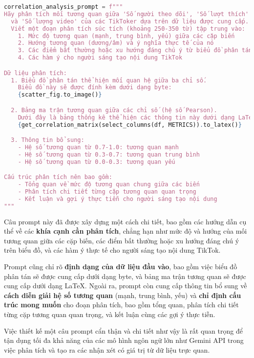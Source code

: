 \vietnameselst
\begin{lstlisting}[language=Python]
correlation_analysis_prompt = f"""
Hãy phân tích mối tương quan giữa 'Số người theo dõi', 'Số lượt thích'
  và 'Số lượng video' của các TikToker dựa trên dữ liệu được cung cấp.
  Viết một đoạn phân tích súc tích (khoảng 250-350 từ) tập trung vào:
    1. Mức độ tương quan (mạnh, trung bình, yếu) giữa các cặp biến
    2. Hướng tương quan (dương/âm) và ý nghĩa thực tế của nó
    3. Các điểm bất thường hoặc xu hướng đáng chú ý từ biểu đồ phân tán
    4. Các hàm ý cho người sáng tạo nội dung TikTok

Dữ liệu phân tích:
  1. Biểu đồ phân tán thể hiện mối quan hệ giữa ba chỉ số. 
    Biểu đồ này sẽ được đính kèm dưới dạng byte:
    {scatter_fig.to_image()}

  2. Bảng ma trận tương quan giữa các chỉ số (hệ số Pearson).
    Dưới đây là bảng thống kê thể hiện các thông tin này dưới dạng LaTeX:
    {get_correlation_matrix(select_columns(df, METRICS)).to_latex()}

  3. Thông tin bổ sung: 
    - Hệ số tương quan từ 0.7-1.0: tương quan mạnh
    - Hệ số tương quan từ 0.3-0.7: tương quan trung bình
    - Hệ số tương quan từ 0.0-0.3: tương quan yếu

Cấu trúc phân tích nên bao gồm:
    - Tổng quan về mức độ tương quan chung giữa các biến
    - Phân tích chi tiết từng cặp tương quan quan trọng 
    - Kết luận và gợi ý thực tiễn cho người sáng tạo nội dung
"""
\end{lstlisting}

Câu prompt này đã được xây dựng một cách chi tiết, bao gồm các hướng dẫn cụ thể về các \textbf{khía cạnh cần phân tích}, chẳng hạn như mức độ và hướng của mối tương quan giữa các cặp biến, các điểm bất thường hoặc xu hướng đáng chú ý trên biểu đồ, và các hàm ý thực tế cho người sáng tạo nội dung TikTok.

Prompt cũng chỉ rõ \textbf{định dạng của dữ liệu đầu vào}, bao gồm việc biểu đồ phân tán sẽ được cung cấp dưới dạng byte, và bảng ma trận tương quan sẽ được cung cấp dưới dạng LaTeX. Ngoài ra, prompt còn cung cấp thông tin bổ sung về \textbf{cách diễn giải hệ số tương quan} (mạnh, trung bình, yếu) và \textbf{chỉ định cấu trúc mong muốn} cho đoạn phân tích, bao gồm tổng quan, phân tích chi tiết từng cặp tương quan quan trọng, và kết luận cùng các gợi ý thực tiễn.

Việc thiết kế một câu prompt cẩn thận và chi tiết như vậy là rất quan trọng để tận dụng tối đa khả năng của các mô hình ngôn ngữ lớn như Gemini API trong việc phân tích và tạo ra các nhận xét có giá trị từ dữ liệu trực quan.
